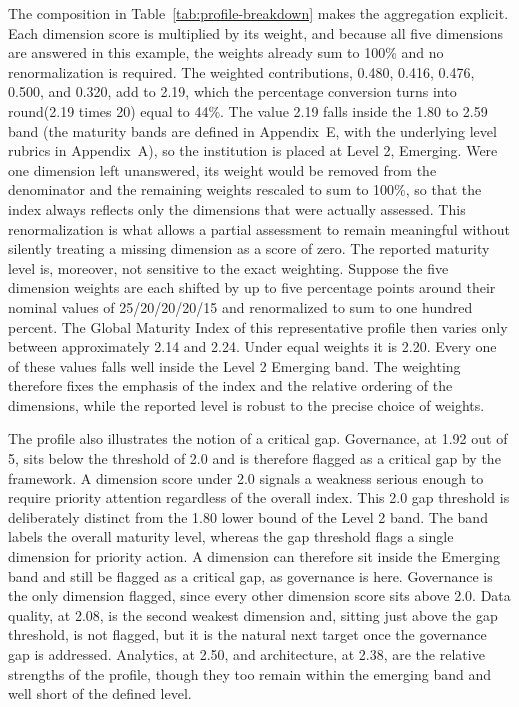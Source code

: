 The composition in Table~\ref{tab:profile-breakdown} makes the aggregation explicit. Each dimension score is multiplied by its weight, and because all five dimensions are answered in this example, the weights already sum to 100\% and no renormalization is required. The weighted contributions, 0.480, 0.416, 0.476, 0.500, and 0.320, add to 2.19, which the percentage conversion turns into round(2.19 times 20) equal to 44\%. The value 2.19 falls inside the 1.80 to 2.59 band (the maturity bands are defined in Appendix~E, with the underlying level rubrics in Appendix~A), so the institution is placed at Level 2, Emerging. Were one dimension left unanswered, its weight would be removed from the denominator and the remaining weights rescaled to sum to 100\%, so that the index always reflects only the dimensions that were actually assessed. This renormalization is what allows a partial assessment to remain meaningful without silently treating a missing dimension as a score of zero. The reported maturity level is, moreover, not sensitive to the exact weighting. Suppose the five dimension weights are each shifted by up to five percentage points around their nominal values of 25/20/20/20/15 and renormalized to sum to one hundred percent. The Global Maturity Index of this representative profile then varies only between approximately 2.14 and 2.24. Under equal weights it is 2.20. Every one of these values falls well inside the Level 2 Emerging band. The weighting therefore fixes the emphasis of the index and the relative ordering of the dimensions, while the reported level is robust to the precise choice of weights.

The profile also illustrates the notion of a critical gap. Governance, at 1.92 out of 5, sits below the threshold of 2.0 and is therefore flagged as a critical gap by the framework. A dimension score under 2.0 signals a weakness serious enough to require priority attention regardless of the overall index. This 2.0 gap threshold is deliberately distinct from the 1.80 lower bound of the Level 2 band. The band labels the overall maturity level, whereas the gap threshold flags a single dimension for priority action. A dimension can therefore sit inside the Emerging band and still be flagged as a critical gap, as governance is here. Governance is the only dimension flagged, since every other dimension score sits above 2.0. Data quality, at 2.08, is the second weakest dimension and, sitting just above the gap threshold, is not flagged, but it is the natural next target once the governance gap is addressed. Analytics, at 2.50, and architecture, at 2.38, are the relative strengths of the profile, though they too remain within the emerging band and well short of the defined level.

